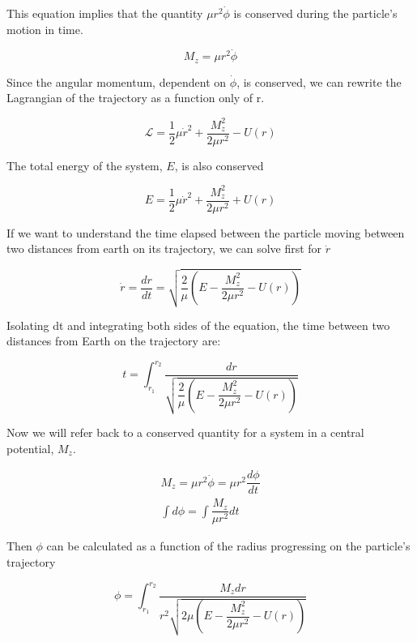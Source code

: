 \documentclass[%
 reprint,
 amsmath,amssymb,
 aps,
]{revtex4-1}
\begin{document}
This equation implies that the quantity $\mu r^2\dot{\phi}$ is conserved during the particle's motion in time.

\begin{equation*}
M_z = \mu r^2\dot{\phi}
\end{equation*}

Since the angular momentum, dependent on $\dot{\phi}$, is conserved, we can rewrite the Lagrangian of the trajectory as a function only of r.

\begin{equation*}
\mathcal{L} = \dfrac{1}{2}\mu\dot{r}^2 + \dfrac{M_z^2}{2\mu r^2} - U(r)
\end{equation*}

The total energy of the system, $E$, is also conserved

\begin{equation*}
E = \dfrac{1}{2}\mu\dot{r}^2 + \dfrac{M_z^2}{2\mu r^2} + U(r)  
\end{equation*}

If we want to understand the time elapsed between the particle moving between two distances from earth on its trajectory, we can solve first for $\dot{r}$

\begin{equation*}
\dot{r} = \dfrac{dr}{dt} = \sqrt{\dfrac{2}{\mu}\left(E-\dfrac{M_z^2}{2\mu r^2} - U(r)\right)}
\end{equation*}

Isolating dt and integrating both sides of the equation, the time between two distances from Earth on the trajectory are:

\begin{equation*}
t = \int_{r_1}^{r_2}\dfrac{dr}{\sqrt{\dfrac{2}{\mu}\left(E-\dfrac{M_z^2}{2\mu r^2} - U(r)\right)}}     
\end{equation*}

Now we will refer back to a conserved quantity for a system in a central potential, $M_z$.

\begin{eqnarray*}
M_z = \mu r^2\dot{\phi} = \mu r^2\dfrac{d\phi}{dt} \\ 
\int d\phi = \int\dfrac{M_z}{\mu r^2}dt
\end{eqnarray*}

Then $\phi$ can be calculated as a function of the radius progressing on the particle's trajectory

\begin{equation*}
\phi = \int_{r_1}^{r_2}\dfrac{M_z dr}{r^2\sqrt{2\mu\left(E-\dfrac{M_z^2}{2\mu r^2} - U(r)\right)}} 
\end{equation*}
\end{document}
